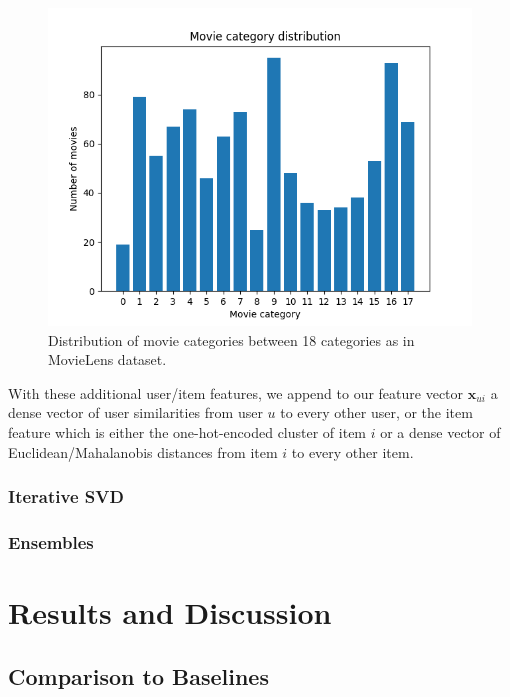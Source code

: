 \documentclass[10pt,conference,compsocconf]{IEEEtran}
\begin{document}
    \begin{figure}
        \label{movie_category_distribution}
        \includegraphics[width=\columnwidth]{figures/movie_category_distribution.png}
        \caption{Distribution of movie categories between 18 categories as in MovieLens dataset.}
    \end{figure}

    With these additional user/item features, we append to our feature vector $\mathbf{x}_{ui}$ a dense vector of user similarities from user $u$ to every other user, or the item feature which is either the one-hot-encoded cluster of item $i$ or a dense vector of Euclidean/Mahalanobis distances from item $i$ to every other item.

    \subsubsection{Iterative SVD}

    \subsubsection{Ensembles}


    \section{Results and Discussion}

    \subsection{Comparison to Baselines}
\end{document}
